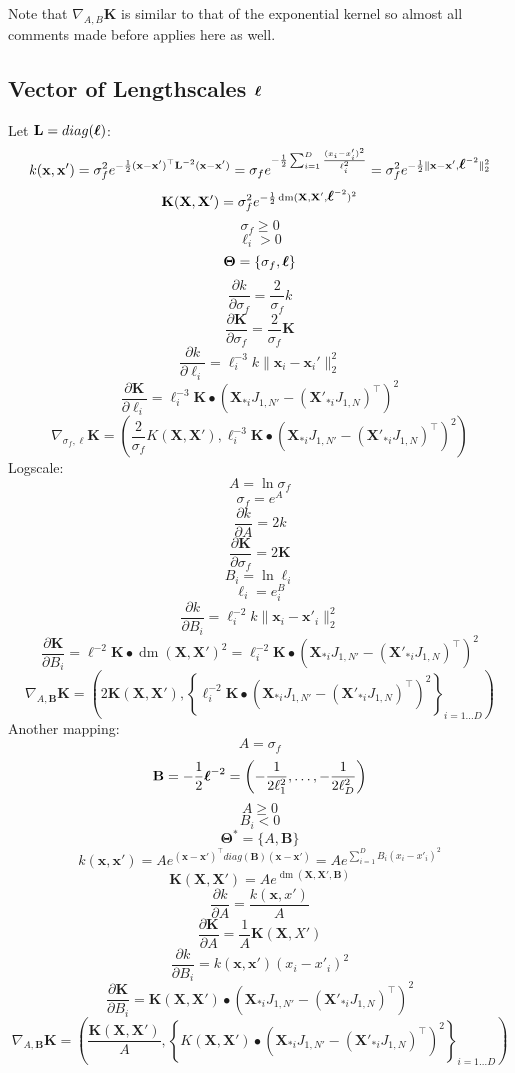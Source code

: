\documentclass[a4paper,11pt]{article}
\newcommand\x{{\mathbf x}}
\newcommand\X{{\mathbf X}}
\newcommand\K{{\mathbf K}}
\newcommand\LL{{\mathbf L}}
\newcommand\ELL{{\Ivec \ell}}
\DeclareMathOperator*{\dm}{dm}
\newcommand{\Ivec}[1]{\mbox{\boldmath $#1$}}
\begin{document}
Note that $\nabla_{A,B} \K$ is similar to that of the exponential
kernel so almost all comments made before applies here as well.


\subsection{Vector of Lengthscales $\ELL$}
Let $\mathbf{L} = diag(\ELL)$:
$$k(\x,\x') = \sigma_f^2 e^{-\frac{1}{2}(\x-\x')^{\top} \LL^{-2}
  (\x-\x')} = \sigma_f e^{-\frac{1}{2}\sum_{i=1}^D \frac{(x_i -
    x'_i)^2}{\ell_i^2}} = \sigma_f^2
e^{-\frac{1}{2}\|\x-\x',\ELL^{-2}\|_2^2}$$
$$\K(\X,\X') = \sigma_f^2 e^{-\frac{1}{2} \dm(\X,\X',\ELL^{-2})^2}$$
$$\sigma_f \ge 0$$
$$\ell_i > 0$$
$$\mathbf{\Theta} = \{ \sigma_f, \ELL\}$$
$$\frac{\partial k}{\partial \sigma_f} = \frac{2}{\sigma_f}k$$
$$\frac{\partial \K}{\partial \sigma_f} = \frac{2}{\sigma_f}\K$$
$$\frac{\partial k}{\partial \ell_i} = \ell_i^{-3} k \|\x_i-\x_i'\|_2^2 $$
$$\frac{\partial \K}{\partial \ell_i} = \ell_i^{-3} \K \bullet (\X_{*i}J_{1,N'}- (\X'_{*i}J_{1,N})^{\top})^2$$
$$\nabla_{\sigma_f,\ell} \K = \left(\frac{2}{\sigma_f}K(\X,\X'), \ell_i^{-3} \K \bullet (\X_{*i}J_{1,N'}- (\X'_{*i}J_{1,N})^{\top})^2 \right)$$
Logscale:
$$A = \ln{\sigma_f}$$
$$\sigma_f = e^A$$
$$\frac{\partial k}{\partial A} = 2k$$
$$\frac{\partial \K}{\partial \sigma_f} = 2\K$$
$$B_i = \ln{\ell_i}$$
$$\ell_i = e^B_i$$
$$\frac{\partial k}{\partial B_i} = \ell_i^{-2} k \|\x_i-\x'_i\|_2^2$$
$$\frac{\partial \K}{\partial B_i} = \ell^{-2} \K \bullet \dm(\X,\X')^2 = \ell_i^{-2} \K \bullet (\X_{*i}J_{1,N'}- (\X'_{*i}J_{1,N})^{\top})^2$$
$$\nabla_{A,\mathbf{B}} \K = \left( 2\K(\X,\X'), \left\{ \ell_i^{-2} \K \bullet (\X_{*i}J_{1,N'}- (\X'_{*i}J_{1,N})^{\top})^2 \right\}_{i=1 \ldots D} \right)$$
Another mapping:
$$A = \sigma_f$$
$$\mathbf{B} = -\frac{1}{2}\ELL^{-2} =
\left(-\frac{1}{2\ell_1^2},\ldots,-\frac{1}{2\ell_D^2} \right)$$
$$A \ge 0$$
$$B_i < 0$$
$$\mathbf{\Theta}^* = \{ A, \mathbf{B}\}$$
$$k(\x,\x') = A e^{(\x-\x')^{\top} diag(\mathbf{B}) (\x-\x')} = A
e^{\sum_{i=1}^D B_i (x_i - x'_i)^2}$$ 
$$\K(\X,\X') = A e^{\dm(\X,\X',\mathbf{B})}$$
$$\frac{\partial k}{\partial A} = \frac{k(\x,x')}{A}$$
$$\frac{\partial \K}{\partial A} = \frac{1}{A}\K(\X,X')$$
$$\frac{\partial k}{\partial B_i} = k(\x,\x') (x_i -x'_i)^2$$
$$\frac{\partial \K}{\partial B_i} = \K(\X,\X') \bullet
(\X_{*i}J_{1,N'}- (\X'_{*i}J_{1,N})^{\top})^2$$
$$\nabla_{A,\mathbf{B}} \K = \left(\frac{\K(\X,\X')}{A}, \left\{ K(\X,\X')
  \bullet (\X_{*i}J_{1,N'}- (\X'_{*i}J_{1,N})^{\top})^2 \right\}_{i=1
  \ldots D} \right)$$
\end{document}
